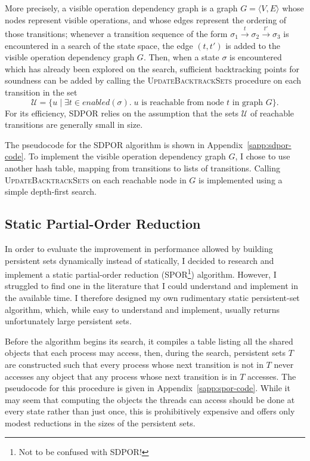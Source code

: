 \documentclass[12pt,a4paper,twoside,openright]{report}
\begin{document}
More precisely, a visible operation dependency
graph is a graph $G = \langle V, E \rangle$ whose
nodes represent visible operations, and whose edges
represent the ordering of those transitions; whenever
a transition sequence of the form
$\sigma_1 \xrightarrow{t} \sigma_2 \xrightarrow{t'}
 \sigma_3$
is encountered in a search of the state space, the
edge $(t, t')$ is added to the visible operation
dependency graph $G$. Then, when a state $\sigma$ is
encountered which has already been explored on the
search, sufficient backtracking points for soundness
can be added by calling the
\textsc{UpdateBacktrackSets} procedure
on each transition in the set
\[\mathcal{U} = \{u \mid \exists t \in \textit{enabled}(\sigma).\;
   u \text{ is reachable from node } t \text{ in graph } G\}.\]
For its efficiency, SDPOR relies on the assumption that
the sets $\mathcal{U}$ of reachable transitions
are generally small in size.

The pseudocode for the SDPOR algorithm is shown
in Appendix~\ref{sapp:sdpor-code}.
To implement the visible operation dependency graph
$G$, I chose to use another hash table,
mapping from transitions to lists of transitions.
Calling \textsc{UpdateBacktrackSets} on
each reachable node in $G$ is implemented using
a simple depth-first search.

\subsection{Static Partial-Order Reduction}
\label{sec:spor-imp}

In order to evaluate the improvement in performance
allowed by building persistent sets dynamically
instead of statically, I decided to research and
implement a static partial-order reduction
(SPOR\footnote{Not to be confused with SDPOR!})
algorithm. However, I struggled to find one
in the literature that I could
understand and implement in the available time.
I therefore designed my own
rudimentary static persistent-set algorithm, which,
while easy to understand and implement,
usually returns unfortunately large persistent sets.

Before the algorithm begins its search, it compiles a table
listing all the shared objects that each process may
access, then, during the search, persistent sets $T$ are
constructed such that
every process whose next transition is
not in $T$ never accesses any
object that any process whose next
transition is in $T$ accesses.
The pseudocode for this procedure is
given in Appendix~\ref{sapp:spor-code}.
While it may seem that computing
the objects the threads can access
should be done at every state rather than
just once, this is prohibitively
expensive and offers only modest
reductions in the sizes of the
persistent sets.
\end{document}

